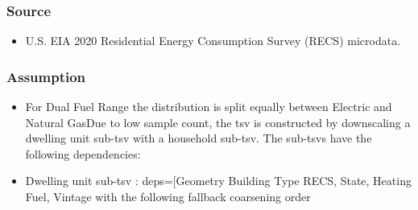 \subsubsection{Source}\label{source-20}

\begin{itemize}
 
\item
  U.S. EIA 2020 Residential Energy Consumption Survey (RECS) microdata.
\end{itemize}

\subsubsection{Assumption}\label{assumption-11}

\begin{itemize}
 
\item
  For Dual Fuel Range the distribution is split equally between Electric
  and Natural GasDue to low sample count, the tsv is constructed by
  downscaling a dwelling unit sub-tsv with a household sub-tsv. The
  sub-tsvs have the following dependencies:
\item
  Dwelling unit sub-tsv : deps={[}\textquotesingle Geometry Building
  Type RECS\textquotesingle, \textquotesingle State\textquotesingle,
  \textquotesingle Heating Fuel\textquotesingle,
  \textquotesingle Vintage\textquotesingle{]} with the following
  fallback coarsening order

  \begin{itemize}
   

\end{itemize}
\end{itemize}
